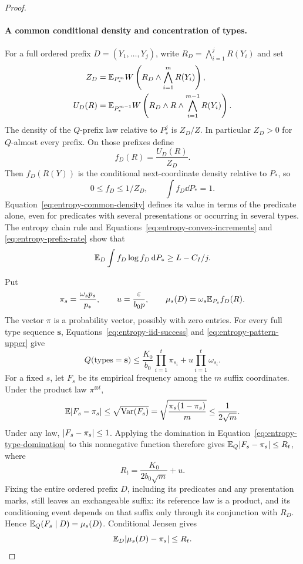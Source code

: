 \begin{proof}
\paragraph{A common conditional density and concentration of types.}
For a full ordered prefix $D=(Y_1,\ldots,Y_j)$, write
$R_D=\bigwedge_{i=1}^jR(Y_i)$ and set
\begin{align*}
 Z_D&=\mathbb E_{P_*^m}W\left(R_D\wedge\bigwedge_{i=1}^mR(Y_i)\right),\\
 U_D(R)&=\mathbb E_{P_*^{m-1}}
          W\left(R_D\wedge R\wedge\bigwedge_{i=1}^{m-1}R(Y_i)\right).
\end{align*}
The density of the $Q$-prefix law relative to $P_*^j$ is $Z_D/Z$.
In particular $Z_D>0$ for $Q$-almost every prefix.  On those prefixes
define
\begin{equation}
 \label{eq:entropy-common-density}
 f_D(R)=\frac{U_D(R)}{Z_D}.
\end{equation}
Then $f_D(R(Y))$ is the conditional next-coordinate density relative to
$P_*$, so
\[
 0\le f_D\le1/Z_D,\qquad \int f_D\dd P_*=1.
\]
Equation~\ref{eq:entropy-common-density} defines its value in terms of
the predicate alone, even for predicates with several presentations or
occurring in several types.  The entropy chain rule and
Equations~\ref{eq:entropy-convex-increments} and
\ref{eq:entropy-prefix-rate} show that
\begin{equation}
 \label{eq:entropy-next-lower}
 \mathbb E_D\int f_D\log f_D\,\mathrm d P_*\ge L-C_I/j.
\end{equation}

Put
\[
 \pi_s=\frac{\omega_s p_s}{p_*},\qquad
 u=\frac{\varepsilon}{b_0p},\qquad
 \mu_s(D)=\omega_s\mathbb E_{P_s}f_D(R).
\]
The vector $\pi$ is a probability vector, possibly with zero entries.
For every full type sequence $\boldsymbol s$,
Equations~\ref{eq:entropy-iid-success} and
\ref{eq:entropy-pattern-upper} give
\begin{equation}
 \label{eq:entropy-type-domination}
 Q\bigl(\text{types}=\boldsymbol s\bigr)
 \le\frac{K_0}{b_0}\prod_{i=1}^t\pi_{s_i}
      +u\prod_{i=1}^t\omega_{s_i}.
\end{equation}
For a fixed $s$, let $F_s$ be its empirical frequency among the $m$
suffix coordinates.  Under the product law $\pi^{\otimes t}$,
\[
 \mathbb E\lvert F_s-\pi_s\rvert
 \le\sqrt{\operatorname{Var}(F_s)}
 =\sqrt{\frac{\pi_s(1-\pi_s)}m}\le\frac1{2\sqrt m}.
\]
Under any law, $\lvert F_s-\pi_s\rvert\le1$.  Applying the domination in
Equation~\ref{eq:entropy-type-domination} to this nonnegative function
therefore gives $\mathbb E_Q\lvert F_s-\pi_s\rvert\le R_t$, where
\begin{equation}
 \label{eq:entropy-type-rate}
 R_t=\frac{K_0}{2b_0\sqrt m}+u.
\end{equation}
Fixing the entire ordered prefix $D$, including its predicates and any
presentation marks, still leaves an exchangeable suffix: its reference
law is a product, and its conditioning event depends on that suffix only
through its conjunction with $R_D$.  Hence
$\mathbb E_Q(F_s\mid D)=\mu_s(D)$.  Conditional Jensen gives
\begin{equation}
 \label{eq:entropy-type-conditional-rate}
 \mathbb E_D\lvert\mu_s(D)-\pi_s\rvert\le R_t.
\end{equation}


\end{proof}

